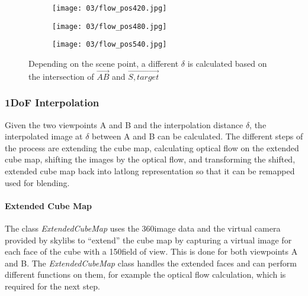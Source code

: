 \begin{figure}
\centering
    \hfill
    \begin{subfigure}[t]{0.33\textwidth}            
            \centering
            \texttt{[image: 03/flow\_pos420.jpg]}
            \caption{}
    \end{subfigure}%
    \hfill
    \begin{subfigure}[t]{0.33\textwidth}
            \centering
            \texttt{[image: 03/flow\_pos480.jpg]}
            \caption{}
    \end{subfigure}
    \hfill
    \begin{subfigure}[t]{0.33\textwidth}
            \centering
            \texttt{[image: 03/flow\_pos540.jpg]}
            \caption{}
    \end{subfigure}
    \hfill
    \caption[Different examples of $\delta$]{Depending on the scene point, a different $\delta$ is calculated based on the intersection of $\overrightarrow{AB}$ and $\overrightarrow{S,target}$} \label{fig:flow_pos}
\end{figure}

\subsubsection{1DoF Interpolation}
Given the two viewpoints A and B and the interpolation distance $\delta$, the interpolated image at $\delta$ between A and B can be calculated. The different steps of the process are extending the cube map, calculating optical flow on the extended cube map, shifting the images by the optical flow, and transforming the shifted, extended cube map back into latlong representation so that it can be remapped used for blending.

\paragraph{Extended Cube Map}
The class \emph{ExtendedCubeMap} uses the 360\degree image data and the virtual camera provided by skylibs \cite{skylibs} to ``extend'' the cube map by capturing a virtual image for each face of the cube with a 150\degree field of view. This is done for both viewpoints A and B. The \emph{ExtendedCubeMap} class handles the extended faces and can perform different functions on them, for example the optical flow calculation, which is required for the next step.

